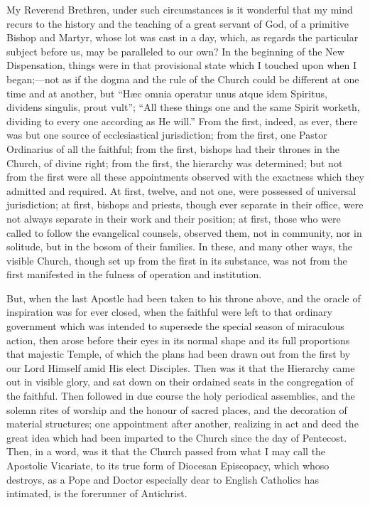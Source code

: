 My Reverend Brethren, under such circumstances is it
wonderful that my mind recurs to the history and the
teaching of a great servant of God, of a primitive Bishop
and Martyr, whose lot was cast in a day, which, as
regards the particular subject before us, may be
paralleled to our own? In the beginning of the New
Dispensation, things were in that provisional state which
I touched upon when I began;—not as if the dogma and
the rule of the Church could be different at one time and
at another, but ``Hæc omnia operatur unus atque idem
Spiritus, dividens singulis, prout vult''; ``All
these things one and the same Spirit worketh, dividing to
every one according as He will.'' From the first,
indeed, as ever, there was but one source of
ecclesiastical jurisdiction; from the first, one Pastor
Ordinarius of all the faithful; from the first, bishops
had their thrones in the Church, of divine right; from
the first, the hierarchy was determined; but not from the
first were all these appointments observed with the
exactness which they admitted and required. At first,
twelve, and not one, were possessed of universal
jurisdiction; at first, bishops and priests, though ever
separate in their office, were not always separate in
their work and their position; at first, those who were
called to follow the evangelical counsels, observed them,
not in community, nor in solitude, but in the bosom of
their families. In these, and many other ways, the
visible Church, though set up from the first in its
substance, was not from the first manifested in the
fulness of operation and institution.

But, when the last Apostle had been taken to his
throne above, and the oracle of inspiration was for ever
closed, when the faithful were left to that ordinary
government which was intended to supersede the special
season of miraculous action, then arose before their eyes
in its normal shape and its full proportions that
majestic Temple, of which the plans had been drawn out
from the first by our Lord Himself amid His elect
Disciples. Then was it that the Hierarchy came out in
visible glory, and sat down on their ordained seats in
the congregation of the faithful. Then followed in due
course the holy periodical assemblies, and the solemn
rites of worship and the honour of sacred places, and the
decoration of material structures; one appointment after
another, realizing in act and deed the great idea which
had been imparted to the Church since the day of
Pentecost. Then, in a word, was it that the Church passed
from what I may call the Apostolic Vicariate, to its true
form of Diocesan Episcopacy, which whoso destroys, as a
Pope and Doctor especially dear to English Catholics has
intimated, is the forerunner of Antichrist.

